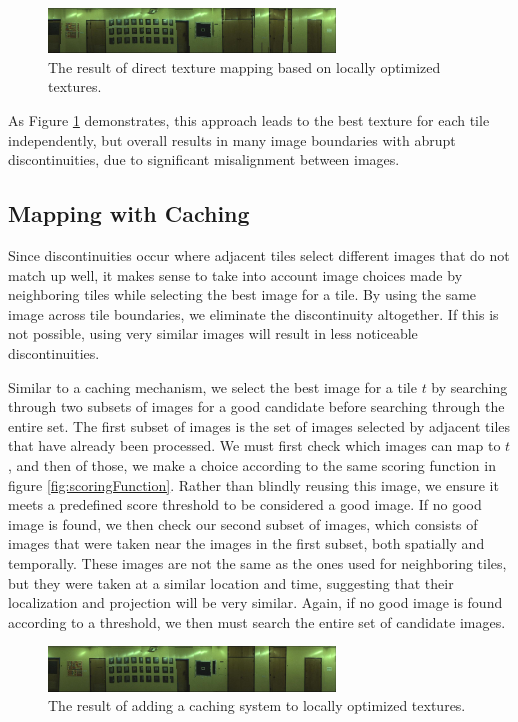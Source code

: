 \documentclass[10pt,twocolumn,letterpaper]{article}
\begin{document}
\begin{figure}
  \centering
  \includegraphics[width=3in]{wall1_naive.jpg}
  \caption{The result of direct texture mapping based on locally
    optimized textures.}
  \label{fig:directMapping}
\end{figure}


As Figure \ref{fig:directMapping} demonstrates, this approach leads to
the best texture for each tile independently, but overall results in
many image boundaries with abrupt discontinuities, due to significant
misalignment between images.

\subsection{Mapping with Caching}
Since discontinuities occur where adjacent tiles select different
images that do not match up well, it makes sense to take into account
image choices made by neighboring tiles while selecting the best image
for a tile. By using the same image across tile boundaries, we
eliminate the discontinuity altogether. If this is not possible, using
very similar images will result in less noticeable discontinuities.

Similar to a caching mechanism, we select the best image for a tile
$t$ by searching through two subsets of images for a good candidate
before searching through the entire set. The first subset of images is
the set of images selected by adjacent tiles that have already been
processed. We must first check which images can map to $t$, and then
of those, we make a choice according to the same scoring function in
figure \ref{fig:scoringFunction}. Rather than blindly reusing this
image, we ensure it meets a predefined score threshold to be
considered a good image. If no good image is found, we then check our
second subset of images, which consists of images that were taken near
the images in the first subset, both spatially and temporally. These
images are not the same as the ones used for neighboring tiles, but
they were taken at a similar location and time, suggesting that their
localization and projection will be very similar. Again, if no good
image is found according to a threshold, we then must search the
entire set of candidate images.

\begin{figure}
  \centering
  \includegraphics[width=3in]{wall1_cache_full.jpg}
  \caption{The result of adding a caching system to locally optimized
    textures.}
  \label{fig:caching}
\end{figure}
\end{document}
